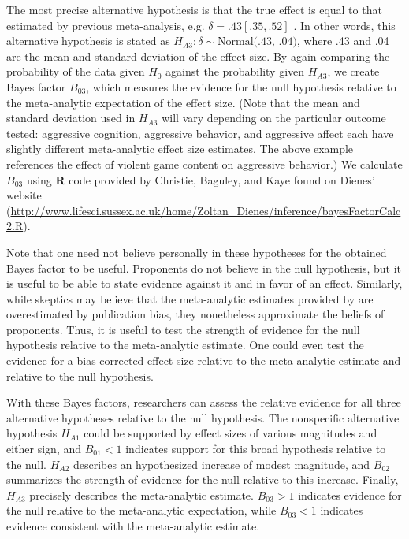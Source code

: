 \documentclass[man]{apa6}
\begin{document}
The most precise alternative hypothesis is that the true effect is equal to that estimated by previous meta-analysis, e.g. $\delta = .43 [.35, .52]$ \citep{Anderson:etal:2010}.  In other words, this alternative hypothesis is stated as $H_{A3}: \delta \sim{} \mbox{Normal(.43, .04)}$, where .43 and .04 are the mean and standard deviation of the effect size. 
By again comparing the probability of the data given $H_0$ against the probability given $H_{A3}$, we create Bayes factor $B_{03}$, which measures the evidence for the null hypothesis relative to the meta-analytic expectation of the effect size. (Note that the mean and standard deviation used in $H_{A3}$ will vary depending on the particular outcome tested: aggressive cognition, aggressive behavior, and aggressive affect each have slightly different meta-analytic effect size estimates. The above example references the effect of violent game content on aggressive behavior.)
We calculate $B_{03}$ using {\bf R} code provided by Christie, Baguley, and Kaye found on Dienes' website (\url{http://www.lifesci.sussex.ac.uk/home/Zoltan_Dienes/inference/bayesFactorCalc2.R}). 

Note that one need not believe personally in these hypotheses for the obtained Bayes factor to be useful. Proponents do not believe in the null hypothesis, but it is useful to be able to state evidence against it and in favor of an effect. Similarly, while skeptics may believe that the meta-analytic estimates provided by \citet{Anderson:etal:2010} are overestimated by publication bias, they nonetheless approximate the beliefs of proponents. Thus, it is useful to test the strength of evidence for the null hypothesis relative to the meta-analytic estimate. One could even test the evidence for a bias-corrected effect size relative to the meta-analytic estimate and relative to the null hypothesis.

With these Bayes factors, researchers can assess the relative evidence for all three alternative hypotheses relative to the null hypothesis. The nonspecific alternative hypothesis $H_{A1}$ could be supported by effect sizes of various magnitudes and either sign, and $B_{01} < 1$ indicates support for this broad hypothesis relative to the null. $H_{A2}$ describes an hypothesized increase of modest magnitude, and $B_{02}$ summarizes the strength of evidence for the null relative to this increase. Finally, $H_{A3}$ precisely describes the meta-analytic estimate. $B_{03} > 1$ indicates evidence for the null relative to the meta-analytic expectation, while $B_{03} < 1$ indicates evidence consistent with the meta-analytic estimate. 
\end{document}
